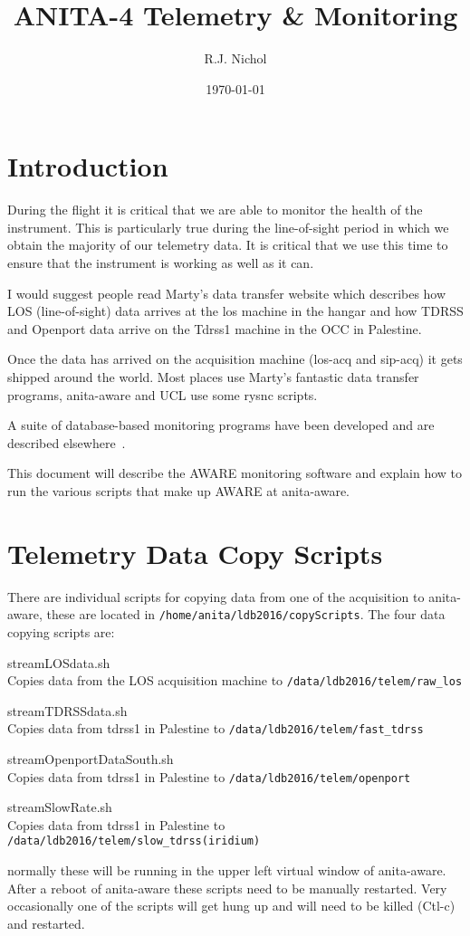 \documentclass{article}
\begin{document}
\title{ANITA-4 Telemetry \& Monitoring}
\author{R.J. Nichol}
  
\date{\today}
\maketitle


\section{Introduction}
During the flight it is critical that we are able to monitor the health of the instrument. This is particularly true during the line-of-sight period in which we obtain the majority of our telemetry data. It is critical that we use this time to ensure that the instrument is working as well as it can.

I would suggest people read Marty's data transfer website which describes how LOS (line-of-sight) data arrives at the los machine in the hangar and how TDRSS and Openport data arrive on the Tdrss1 machine in the OCC in Palestine\cite{web:martyDataTransfer}.

Once the data has arrived on the acquisition machine (los-acq and sip-acq) it gets shipped around the world. Most places use Marty's fantastic data transfer programs, anita-aware and UCL use some rysnc scripts.

A suite of database-based monitoring programs have been developed and are described elsewhere~\cite{web:anitaMonitoring}.

This document will describe the AWARE monitoring software and explain how to run the various scripts that make up AWARE at anita-aware.

\section{Telemetry Data Copy Scripts}
There are individual scripts for copying data from one of the acquisition to anita-aware, these are located in {\tt  /home/anita/ldb2016/copyScripts}. The four data copying scripts are:
\begin{description}
\item{streamLOSdata.sh} \\Copies data from the LOS acquisition machine to {\tt /data/ldb2016/telem/raw\_los}
\item{streamTDRSSdata.sh} \\Copies data from tdrss1 in Palestine to {\tt /data/ldb2016/telem/fast\_tdrss}
\item{streamOpenportDataSouth.sh} \\Copies data from tdrss1 in Palestine to {\tt /data/ldb2016/telem/openport}
\item{streamSlowRate.sh} \\Copies data from tdrss1 in Palestine to {\tt /data/ldb2016/telem/slow\_tdrss(iridium)}
\end{description}
normally these will be running in the upper left virtual window of anita-aware. After a reboot of anita-aware these scripts need to be manually restarted. Very occasionally one of the scripts will get hung up and will need to be killed (Ctl-c) and restarted.
\end{document}
